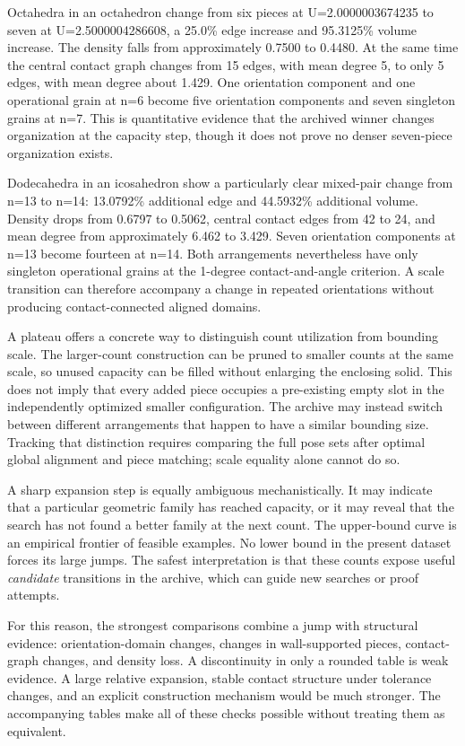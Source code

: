 \documentclass[11pt,a4paper]{article}
\begin{document}
Octahedra in an octahedron change from six pieces at U=2.0000003674235 to seven at U=2.5000004286608, a 25.0\% edge increase and 95.3125\% volume increase. The density falls from approximately 0.7500 to 0.4480. At the same time the central contact graph changes from 15 edges, with mean degree 5, to only 5 edges, with mean degree about 1.429. One orientation component and one operational grain at n=6 become five orientation components and seven singleton grains at n=7. This is quantitative evidence that the archived winner changes organization at the capacity step, though it does not prove no denser seven-piece organization exists.

Dodecahedra in an icosahedron show a particularly clear mixed-pair change from n=13 to n=14: 13.0792\% additional edge and 44.5932\% additional volume. Density drops from 0.6797 to 0.5062, central contact edges from 42 to 24, and mean degree from approximately 6.462 to 3.429. Seven orientation components at n=13 become fourteen at n=14. Both arrangements nevertheless have only singleton operational grains at the 1-degree contact-and-angle criterion. A scale transition can therefore accompany a change in repeated orientations without producing contact-connected aligned domains.

A plateau offers a concrete way to distinguish count utilization from bounding scale. The larger-count construction can be pruned to smaller counts at the same scale, so unused capacity can be filled without enlarging the enclosing solid. This does not imply that every added piece occupies a pre-existing empty slot in the independently optimized smaller configuration. The archive may instead switch between different arrangements that happen to have a similar bounding size. Tracking that distinction requires comparing the full pose sets after optimal global alignment and piece matching; scale equality alone cannot do so.

A sharp expansion step is equally ambiguous mechanistically. It may indicate that a particular geometric family has reached capacity, or it may reveal that the search has not found a better family at the next count. The upper-bound curve is an empirical frontier of feasible examples. No lower bound in the present dataset forces its large jumps. The safest interpretation is that these counts expose useful \emph{candidate} transitions in the archive, which can guide new searches or proof attempts.

For this reason, the strongest comparisons combine a jump with structural evidence: orientation-domain changes, changes in wall-supported pieces, contact-graph changes, and density loss. A discontinuity in only a rounded table is weak evidence. A large relative expansion, stable contact structure under tolerance changes, and an explicit construction mechanism would be much stronger. The accompanying tables make all of these checks possible without treating them as equivalent.
\end{document}
